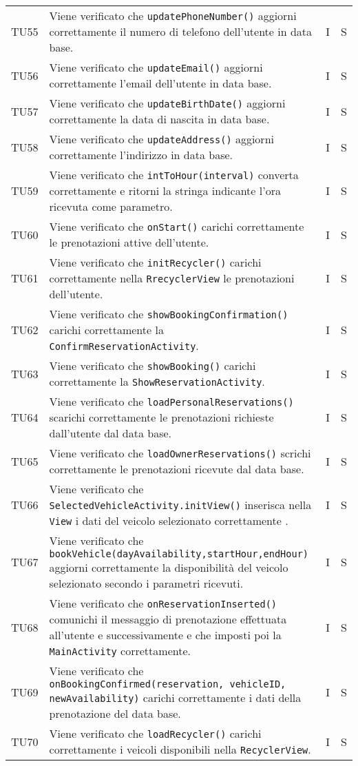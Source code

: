 \begin{longtable}{ >{\centering}p{}  >{\centering}p{} >{\centering}p{}
			>{\centering}p{}}
		\tabularnewline	
		TU55 & Viene verificato che \texttt{updatePhoneNumber()} aggiorni correttamente il numero di telefono dell'utente in data base. & I & S
		\tabularnewline	
		TU56 & Viene verificato che \texttt{updateEmail()} aggiorni correttamente l'email dell'utente in data base. & I & S
		\tabularnewline	
		TU57 & Viene verificato che \texttt{updateBirthDate()} aggiorni correttamente la data di nascita in data base. & I & S
		\tabularnewline	
		TU58 & Viene verificato che \texttt{updateAddress()} aggiorni correttamente l'indirizzo in data base. & I & S
		\tabularnewline	
		TU59 & Viene verificato che \texttt{intToHour(interval)} converta correttamente e ritorni la stringa indicante l'ora ricevuta come parametro. & I & S
		\tabularnewline	
		TU60 & Viene verificato che \texttt{onStart()} carichi correttamente le prenotazioni attive dell'utente. & I & S
		\tabularnewline	
		TU61 & Viene verificato che \texttt{initRecycler()} carichi correttamente nella \texttt{RrecyclerView} le prenotazioni dell'utente. & I & S
		\tabularnewline	
		TU62 & Viene verificato che \texttt{showBookingConfirmation()} carichi correttamente la \texttt{ConfirmReservationActivity}. & I & S
		\tabularnewline	
		TU63 & Viene verificato che \texttt{showBooking()} carichi correttamente la \texttt{ShowReservationActivity}. & I & S
		\tabularnewline	
		TU64 & Viene verificato che \texttt{loadPersonalReservations()} scarichi correttamente le prenotazioni richieste dall'utente dal data base. & I & S
		\tabularnewline	
		TU65 & Viene verificato che \texttt{loadOwnerReservations()} scrichi correttamente le prenotazioni ricevute dal data base. & I & S
		\tabularnewline	
		TU66 & Viene verificato che \texttt{SelectedVehicleActivity.initView()} inserisca nella \texttt{View} i dati del veicolo selezionato correttamente . & I & S
		\tabularnewline	
		TU67 & Viene verificato che \texttt{bookVehicle(dayAvailability,startHour,endHour)} aggiorni correttamente la disponibilità del veicolo selezionato secondo i parametri ricevuti. & I & S
		\tabularnewline	
		TU68 & Viene verificato che \texttt{onReservationInserted()} comunichi il messaggio di prenotazione effettuata all'utente e successivamente e che imposti poi la \texttt{MainActivity} correttamente. & I & S
		\tabularnewline	
		TU69 & Viene verificato che \texttt{onBookingConfirmed(reservation, vehicleID, newAvailability)} carichi correttamente i dati della prenotazione del data base. & I & S
		\tabularnewline	
		TU70 & Viene verificato che \texttt{loadRecycler()} carichi correttamente i veicoli disponibili nella \texttt{RecyclerView}. & I & S \tabularnewline	
		

\end{longtable}
